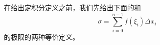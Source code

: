 
在给出定积分定义之前，我们先给出下面的和
\begin{equation}
\sigma=\sum_{i=0}^{n-1}f(\xi_i)\Delta x_i
\end{equation}
的极限的两种等价定义。